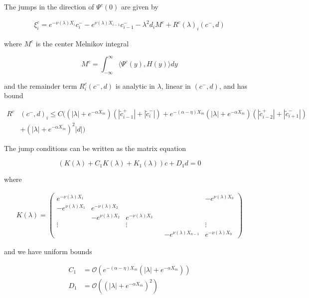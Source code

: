\documentclass[thesis.tex]{subfiles}
\begin{document}

\begin{lemma}\label{jumpcenteradj}

The jumps in the direction of $\Psi^c(0)$ are given by

\begin{align}\label{xic}
\xi^c_i = e^{-\nu(\lambda) X_i} c_i^- - e^{\nu(\lambda) X_{i-1}} c_{i-1}^- - \lambda^2 d_i M^c + R^c(\lambda)_i(c^-, d)
\end{align}

where $M^c$ is the center Melnikov integral

\begin{equation}\label{Mc}
M^c =  \int_{-\infty}^\infty \langle \Psi^c(y), H(y) \rangle dy 
\end{equation}

and the remainder term $R^c_i(c^-, d)$ is analytic in $\lambda$, linear in $(c^-, d)$, and has bound

\begin{align}\label{Rc}
R^c&(c^-, d)_i \leq C \Big(
(|\lambda| + e^{-\alpha X_m})(|\tilde{c}_{i-1}^+| + |\tilde{c}_{i}^-|) + e^{-(\alpha - \eta) X_m } (|\lambda| + e^{-\alpha X_m})(  |\tilde{c}_{i-2}^+| + |\tilde{c}_{i+1}^-|)  \\
&+ (|\lambda| + e^{-\alpha X_m})^2 |d|
\Big) \nonumber
\end{align}

The jump conditions can be written as the matrix equation

\begin{equation}\label{matrixjumpc}
(K(\lambda) + C_1 K(\lambda) + K_1(\lambda)) c + D_1 d = 0
\end{equation}

where

\begin{align*}
K(\lambda) =  
\begin{pmatrix}
e^{-\nu(\lambda)X_1} & & & & & -e^{\nu(\lambda)X_0} \\
-e^{\nu(\lambda)X_1} & e^{-\nu(\lambda)X_2} \\
& -e^{\nu(\lambda)X_2} & e^{-\nu(\lambda)X_3} \\
\vdots & & \vdots & &&  \vdots \\
& & & & -e^{\nu(\lambda)X_{n-1}} & e^{-\nu(\lambda)X_0} 
\end{pmatrix}
\end{align*}

and we have uniform bounds

\begin{align*}
C_1 &= \mathcal{O}(e^{-(\alpha - \eta) X_m}(|\lambda| + e^{-\alpha X_m})) \\
D_1 &= \mathcal{O}((|\lambda| + e^{-\alpha X_m})^2)
\end{align*}


\end{lemma}
\end{document}
